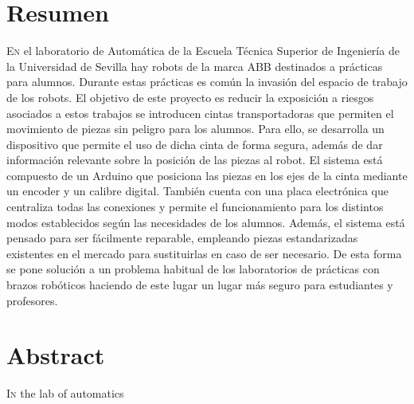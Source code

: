 \chapter*{Resumen}
\pagestyle{especial}
{}

\lettrine[lraise=-0.1, lines=2, loversize=0.2]{E}n el laboratorio de Automática
de la Escuela Técnica Superior de Ingeniería de la Universidad de Sevilla 
hay robots de la marca ABB destinados a prácticas para alumnos. Durante estas 
prácticas es común la invasión del espacio de trabajo de los robots. El objetivo de
este proyecto es reducir 
la exposición a riesgos asociados a estos trabajos se introducen cintas transportadoras
que permiten el movimiento de piezas sin peligro para los alumnos. Para ello,
se desarrolla un dispositivo que permite el uso de dicha cinta de forma segura, 
además de dar información relevante sobre la posición de las piezas al robot.
El sistema está compuesto de un Arduino que posiciona las piezas en los ejes de la cinta
mediante un encoder y un calibre digital. También cuenta con una placa electrónica que
centraliza todas las conexiones y permite el funcionamiento para los distintos modos establecidos
según las necesidades de los alumnos.
Además, el sistema está pensado para ser fácilmente reparable, empleando piezas 
estandarizadas existentes en el mercado para sustituirlas en caso de ser necesario.
De esta forma se pone solución a un problema habitual de los laboratorios de prácticas con brazos
robóticos haciendo de este lugar un lugar más seguro para estudiantes y profesores.


\chapter*{Abstract}
\pagestyle{especial}
{}

\lettrine[lraise=-0.1, lines=2, loversize=0.2]{I}{n} the lab of automatics